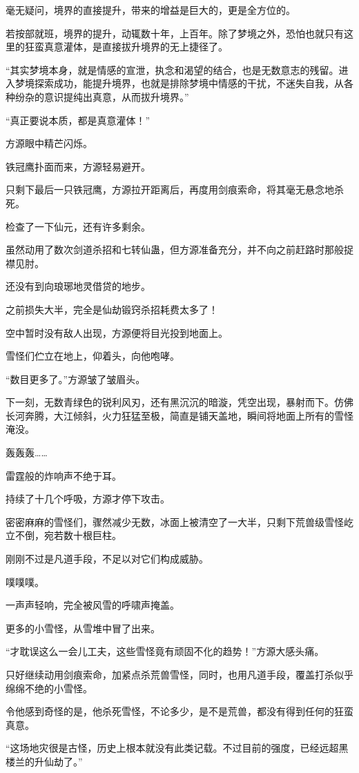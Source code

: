 \begin{this_body}
毫无疑问，境界的直接提升，带来的增益是巨大的，更是全方位的。

若按部就班，境界的提升，动辄数十年，上百年。除了梦境之外，恐怕也就只有这里的狂蛮真意灌体，是直接拔升境界的无上捷径了。

“其实梦境本身，就是情感的宣泄，执念和渴望的结合，也是无数意志的残留。进入梦境探索成功，能提升境界，也就是排除梦境中情感的干扰，不迷失自我，从各种纷杂的意识提纯出真意，从而拔升境界。”

“真正要说本质，都是真意灌体！”

方源眼中精芒闪烁。

铁冠鹰扑面而来，方源轻易避开。

只剩下最后一只铁冠鹰，方源拉开距离后，再度用剑痕索命，将其毫无悬念地杀死。

检查了一下仙元，还有许多剩余。

虽然动用了数次剑道杀招和七转仙蛊，但方源准备充分，并不向之前赶路时那般捉襟见肘。

还没有到向琅琊地灵借贷的地步。

之前损失大半，完全是仙劫锻窍杀招耗费太多了！

空中暂时没有敌人出现，方源便将目光投到地面上。

雪怪们伫立在地上，仰着头，向他咆哮。

“数目更多了。”方源皱了皱眉头。

下一刻，无数青绿色的锐利风刃，还有黑沉沉的暗漩，凭空出现，暴射而下。仿佛长河奔腾，大江倾斜，火力狂猛至极，简直是铺天盖地，瞬间将地面上所有的雪怪淹没。

轰轰轰……

雷霆般的炸响声不绝于耳。

持续了十几个呼吸，方源才停下攻击。

密密麻麻的雪怪们，骤然减少无数，冰面上被清空了一大半，只剩下荒兽级雪怪屹立不倒，宛若数十根巨柱。

刚刚不过是凡道手段，不足以对它们构成威胁。

噗噗噗。

一声声轻响，完全被风雪的呼啸声掩盖。

更多的小雪怪，从雪堆中冒了出来。

“才耽误这么一会儿工夫，这些雪怪竟有顽固不化的趋势！”方源大感头痛。

只好继续动用剑痕索命，加紧点杀荒兽雪怪，同时，也用凡道手段，覆盖打杀似乎绵绵不绝的小雪怪。

令他感到奇怪的是，他杀死雪怪，不论多少，是不是荒兽，都没有得到任何的狂蛮真意。

“这场地灾很是古怪，历史上根本就没有此类记载。不过目前的强度，已经远超黑楼兰的升仙劫了。”


\end{this_body}

